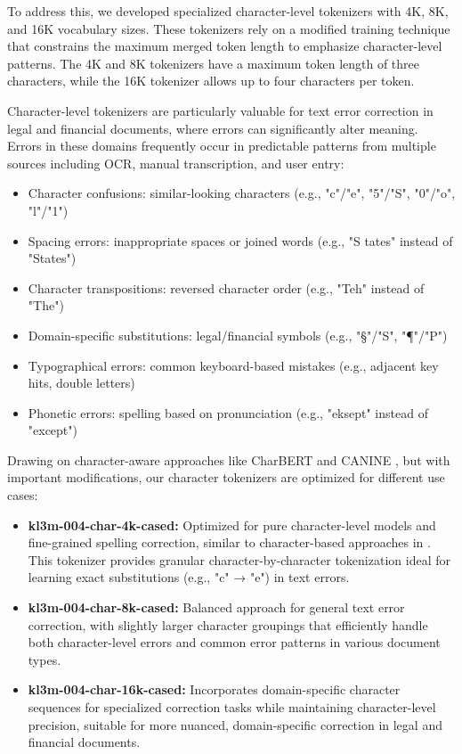 To address this, we developed specialized character-level tokenizers with 4K, 8K, and 16K vocabulary sizes.  These tokenizers rely on a modified training technique that constrains the maximum merged token length to emphasize character-level patterns.  The 4K and 8K tokenizers have a maximum token length of three characters, while the 16K tokenizer allows up to four characters per token.

Character-level tokenizers are particularly valuable for text error correction in legal and financial documents, where errors can significantly alter meaning. Errors in these domains frequently occur in predictable patterns from multiple sources including OCR, manual transcription, and user entry:

\begin{itemize}
    \item Character confusions: similar-looking characters (e.g., "c"/"e", "5"/"S", "0"/"o", "l"/"1")
    \item Spacing errors: inappropriate spaces or joined words (e.g., "S tates" instead of "States")
    \item Character transpositions: reversed character order (e.g., "Teh" instead of "The")
    \item Domain-specific substitutions: legal/financial symbols (e.g., "§"/"S", "¶"/"P")
    \item Typographical errors: common keyboard-based mistakes (e.g., adjacent key hits, double letters)
    \item Phonetic errors: spelling based on pronunciation (e.g., "eksept" instead of "except")
\end{itemize}


Drawing on character-aware approaches like CharBERT \cite{ma2020charbert} and CANINE \cite{clark2022canine}, but with important modifications, our character tokenizers are optimized for different use cases:

\begin{itemize}
    \item \textbf{kl3m-004-char-4k-cased:} Optimized for pure character-level models and fine-grained spelling correction, similar to character-based approaches in \cite{ma2020charbert}. This tokenizer provides granular character-by-character tokenization ideal for learning exact substitutions (e.g., "c" → "e") in text errors.
    
    \item \textbf{kl3m-004-char-8k-cased:} Balanced approach for general text error correction, with slightly larger character groupings that efficiently handle both character-level errors and common error patterns in various document types.
    
    \item \textbf{kl3m-004-char-16k-cased:} Incorporates domain-specific character sequences for specialized correction tasks while maintaining character-level precision, suitable for more nuanced, domain-specific correction in legal and financial documents.
\end{itemize}

